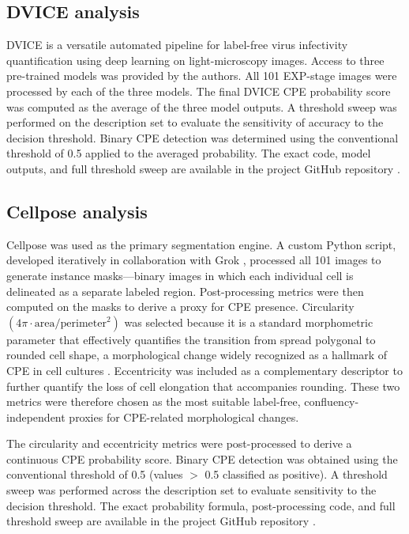 \subsection*{DVICE analysis}
DVICE \cite{dvice} is a versatile automated pipeline for label-free virus infectivity quantification using deep learning on light-microscopy images. Access to three pre-trained models was provided by the authors. All 101 EXP-stage images were processed by each of the three models. The final DVICE CPE probability score was computed as the average of the three model outputs. A threshold sweep was performed on the description set to evaluate the sensitivity of accuracy to the decision threshold. Binary CPE detection was determined using the conventional threshold of 0.5 applied to the averaged probability. The exact code, model outputs, and full threshold sweep are available in the project GitHub repository \cite{github-verocell}.

\subsection*{Cellpose analysis}
Cellpose \cite{cellpose} was used as the primary segmentation engine. A custom Python script, developed iteratively in collaboration with Grok \cite{grok}, processed all 101 images to generate instance masks---binary images in which each individual cell is delineated as a separate labeled region. Post-processing metrics were then computed on the masks to derive a proxy for CPE presence. Circularity \((4\pi \cdot \text{area} / \text{perimeter}^2)\) was selected because it is a standard morphometric parameter that effectively quantifies the transition from spread polygonal to rounded cell shape, a morphological change widely recognized as a hallmark of CPE in cell cultures \cite{clsi,asm_cpe,zupin,fukaya}. Eccentricity was included as a complementary descriptor to further quantify the loss of cell elongation that accompanies rounding. These two metrics were therefore chosen as the most suitable label-free, confluency-independent proxies for CPE-related morphological changes.



The circularity and eccentricity metrics were post-processed to derive a continuous CPE probability score. Binary CPE detection was obtained using the conventional threshold of 0.5 (values $>$ 0.5 classified as positive). A threshold sweep was performed across the description set to evaluate sensitivity to the decision threshold. The exact probability formula, post-processing code, and full threshold sweep are available in the project GitHub repository \cite{github-verocell}.

